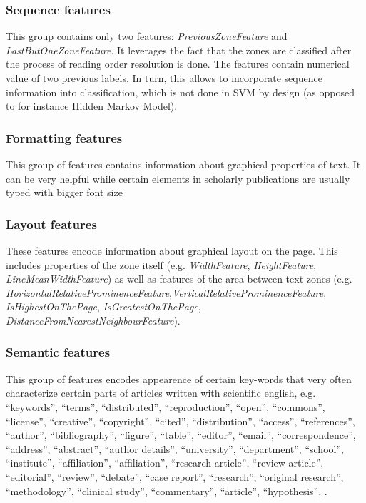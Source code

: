 \subsubsection{Sequence features}
This group contains only two features: \textit{PreviousZoneFeature} and \textit{LastButOneZoneFeature}. It leverages the fact that the zones are classified after the process of reading order resolution is done. The features contain numerical value of two previous labels. In turn, this allows to incorporate sequence information into classification, which is not done in SVM by design (as opposed to for instance Hidden Markov Model).
\subsubsection{Formatting features}
This group of features contains information about graphical properties of text. It can be very helpful while certain elements in scholarly publications are usually typed with bigger font size
\subsubsection{Layout features}
These features encode information about graphical layout on the page. This includes properties of the zone itself (e.g. \textit{WidthFeature}, \textit{HeightFeature}, \textit{LineMeanWidthFeature}) as well as features of the area between text zones (e.g. \textit{HorizontalRelativeProminenceFeature},\textit{VerticalRelativeProminenceFeature}, \textit{IsHighestOnThePage}, \textit{IsGreatestOnThePage}, \textit{DistanceFromNearestNeighbourFeature}). 
\subsubsection{Semantic features}
This group of features encodes appearence of certain key-words that very often characterize certain parts of articles written with scientific english, e.g. ``keywords'', ``terms'', ``distributed'', ``reproduction'', ``open'', ``commons'', ``license'', ``creative'', ``copyright'', ``cited'', ``distribution'', ``access'', ``references'', ``author'', ``bibliography'', ``figure'', ``table'', ``editor'', ``email'', ``correspondence'', ``address'', ``abstract'', ``author details'', ``university'', ``department'', ``school'', ``institute'', ``affiliation'', ``affiliation'', ``research article'', ``review article'', ``editorial'', ``review'', ``debate'', ``case report'', ``research'', ``original research'', ``methodology'', ``clinical study'', ``commentary'', ``article'', 
 ``hypothesis'', .
